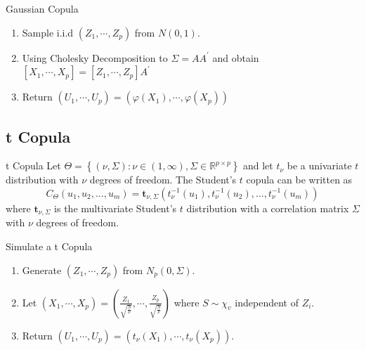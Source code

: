 \documentclass[12pt]{article}
\begin{document}
\begin{algorithm}{Gaussian Copula}{}
\begin{enumerate}
	\item Sample i.i.d $(Z_1,\cdots,Z_p)$ from $N(0,1)$.
	\item Using Cholesky Decomposition to $\Sigma=A A^\prime$ and obtain $[X_1,\cdots,X_p]=[Z_1,\cdots,Z_p]A^\prime$
	\item Return $(U_1,\cdots,U_p) = (\varphi(X_1),\cdots,\varphi(X_p))$
\end{enumerate}
\end{algorithm}


\subsection{t Copula}
\begin{sdefinition}{t Copula}{}
	Let $\Theta=\left\{(\nu, \Sigma): \nu \in(1, \infty), \Sigma \in \mathbb{R}^{p \times p}\right\}$ and let $t_\nu$ be a univariate $t$ distribution with $\nu$ degrees of freedom.
The Student's $t$ copula can be written as
$$
C_{\Theta}\left(u_1, u_2, \ldots, u_m\right)=\boldsymbol{t}_{\nu, \Sigma}\left(t_\nu^{-1}\left(u_1\right), t_\nu^{-1}\left(u_2\right), \ldots, t_\nu^{-1}\left(u_m\right)\right)
$$
where $\boldsymbol{t}_{\nu, \Sigma}$ is the multivariate Student's $t$ distribution with a correlation matrix $\Sigma$ with $\nu$ degrees of freedom.
\end{sdefinition}

\begin{algorithm}{Simulate a t Copula}{}
\begin{enumerate}
	\item Generate $(Z_1,\cdots,Z_p)$ from $N_p(0,\Sigma)$.
	\item Let $(X_1,\cdots,X_p)=(\frac{Z_1}{\sqrt{\frac{S}{\nu}}},\cdots,\frac{Z_p}{\sqrt{\frac{S}{\nu}}})$ where $S\sim \chi_v$ independent of $Z_i$.
	\item Return $(U_1,\cdots,U_p)=(t_\nu(X_1),\cdots,t_\nu(X_p))$.
\end{enumerate}

\end{algorithm}
\end{document}
